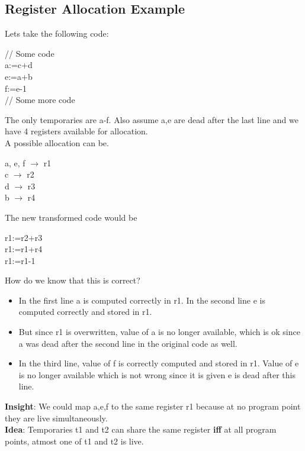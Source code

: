 \subsection{Register Allocation Example}
Lets take the following code:\\
\begin{center}
    // Some code\\
    a:=c+d\\
    e:=a+b\\
    f:=e-1\\
    // Some more code\\
\end{center}
The only temporaries are a-f.
Also assume a,e are dead after the  last line and we have 4 registers available for allocation.\\
A possible allocation can be.
\begin{center}
    a, e, f $\rightarrow$ r1\\
    c $\rightarrow$ r2\\
    d $\rightarrow$ r3\\
    b $\rightarrow$ r4\\
\end{center}
The new transformed code would be
\begin{center}
    r1:=r2+r3\\
    r1:=r1+r4\\
    r1:=r1-1\\
\end{center}
How do we know that this is correct?
\begin{itemize}
    \item In the first line a is computed correctly in r1. In the second line e is computed correctly and stored in r1.
    \item But since r1 is overwritten, value of a is no longer available, which is ok since a was dead after the second line in the original code as well.
    \item In the third line, value of f is correctly computed and stored in r1. Value of e is no longer available which is not wrong since it is given e is dead after this line.
\end{itemize}
\textbf{Insight}: We could map a,e,f to the same register r1 because at no program point they are live simultaneously.\\
\textbf{Idea}: Temporaries t1 and t2 can share the same register \textbf{iff} at all program points, atmost one of t1 and t2 is live.
